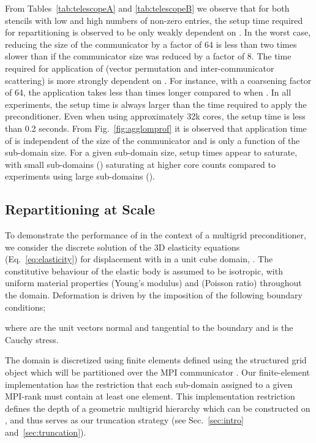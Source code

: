 \documentclass[]{siamart0216}
\begin{document}
From Tables~\ref{tab:telescopeA} and \ref{tab:telescopeB} we observe that for both stencils with low and high numbers of non-zero entries, 
the setup time required for repartitioning is observed to be only weakly dependent on . 
In the worst case, reducing the size of the communicator by a factor of 64 is less than two times slower than if the communicator size was reduced by a factor of 8.
The time required for application of  (vector permutation and inter-communicator scattering) is more strongly dependent on . For instance, with a coarsening factor of 64, the application takes less than  times longer compared to when .
In all experiments, the setup time is always larger than the time required to apply the preconditioner.
Even when using approximately 32k cores, the setup time is less than 0.2 seconds.
From Fig.~\ref{fig:agglomprof} it is observed that application time of  is independent of the size of the communicator and is only a function of the sub-domain size.
For a given sub-domain size, setup times appear to saturate, 
with small sub-domains () saturating at higher core counts compared to experiments using large sub-domains ().

\subsection{Repartitioning at Scale} \label{sec:partitioningatscale}
To demonstrate the performance of  in the context of a multigrid preconditioner, we 
consider the discrete solution of the 3D elasticity equations (Eq.~\eqref{eq:elasticity}) for displacement  
with  in a unit cube domain, . 
The constitutive behaviour of the elastic body is assumed to be isotropic, with uniform material properties 
 (Young's modulus) and  (Poisson ratio) throughout the domain.
Deformation is driven by the imposition of the following boundary conditions;

where  are the unit vectors normal and tangential to the boundary and  is 
the Cauchy stress.

The domain  is discretized using   finite elements defined using the  structured grid object 
which will be partitioned over the MPI communicator . 
Our finite-element implementation has the restriction that each sub-domain assigned to a given MPI-rank must contain at 
least one  element. This implementation restriction defines the depth of a geometric multigrid hierarchy 
which can be constructed on , 
and thus serves as our truncation strategy (see Sec.~\ref{sec:intro} and~\ref{sec:truncation}).
\end{document}
